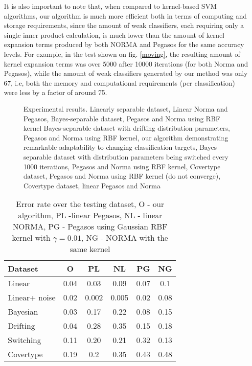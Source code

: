 \documentclass[10pt,twocolumn, a4paper]{article}
\begin{document}
It is also important to note that, when compared to kernel-based SVM algorithms, our algorithm is much more efficient both in terms of computing and storage requirements, since the amount of weak classifiers, each requiring only a single inner product calculation, is much lower than the amount of kernel expansion terms produced by both NORMA and Pegasos for the same accuracy levels. For example, in the test shown on fig. \ref{moving},  the resulting amount of kernel expansion terms was over 5000 after 10000 iterations (for both Norma and Pegasos), while the amount of weak classifiers generated by our method was only 67, i.e, both the memory and computational requirements (per classification) were less by a factor of around 75. 
\begin{figure*}[t]
    \centering


    \caption{Experimental results.\protect {} Linearly separable dataset, Linear Norma and Pegasos, \protect {} Bayes-separable dataset, Pegasos and Norma using RBF kernel \protect {} Bayes-separable dataset with drifting distribution parameters, Pegasos and Norma using RBF kernel, our algorithm demonstrating remarkable adaptability to changing classification targets,  \protect {} Bayes-separable dataset with  distribution parameters being switched every 1000 iterations, Pegasos and Norma using RBF kernel, \protect {} Covertype dataset, Pegasos and Norma using RBF kernel (do not converge), \protect {}   Covertype dataset, linear Pegasos and Norma} 
    \label{Results}
\end{figure*}
\begin{table}
\centering
\begin{tabular}{| p{1.5cm}|  c |  c | c | c | c |}
\hline
 Dataset & O & PL & NL & PG & NG \\ \hline
Linear& 0.04 & 0.03 & 0.09 &0.07 &0.1 \\ \hline
Linear+ noise & 0.02 & 0.002 & 0.005 & 0.02 & 0.08 \\ \hline
Bayesian & 0.03 &0.17 & 0.22 & 0.08 & 0.15 \\ \hline
Drifting & 0.04 & 0.28 & 0.35 & 0.15&0.18 \\ \hline
Switching & 0.11 & 0.20 &0.21 & 0.32 & 0.13  \\ \hline
Covertype & 0.19 & 0.2 & 0.35 & 0.43 & 0.48 \\
\hline
\end{tabular}

\caption{Error rate over the testing dataset, O - our algorithm, PL -linear Pegasos, NL - linear NORMA, PG - Pegasos using Gaussian RBF kernel with $\gamma=0.01$, NG - NORMA with the same kernel}
\label{GenError}
\end{table}
\end{document}
